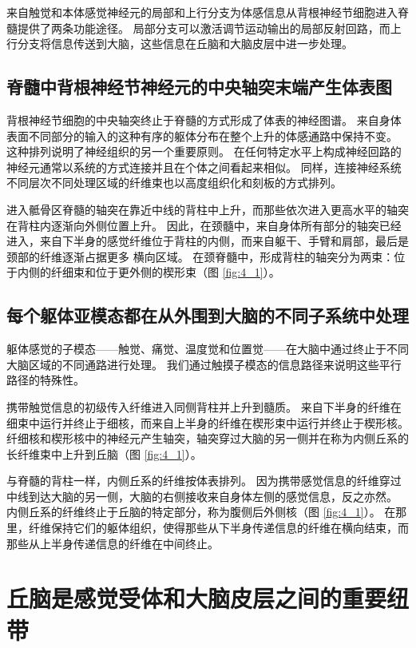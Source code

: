 来自触觉和本体感觉神经元的局部和上行分支为体感信息从背根神经节细胞进入脊髓提供了两条功能途径。 
局部分支可以激活调节运动输出的局部反射回路，而上行分支将信息传送到大脑，这些信息在丘脑和大脑皮层中进一步处理。


\subsection{脊髓中背根神经节神经元的中央轴突末端产生体表图}
背根神经节细胞的中央轴突终止于脊髓的方式形成了体表的神经图谱。 
来自身体表面不同部分的输入的这种有序的躯体分布在整个上升的体感通路中保持不变。 
这种排列说明了神经组织的另一个重要原则。 
在任何特定水平上构成神经回路的神经元通常以系统的方式连接并且在个体之间看起来相似。 
同样，连接神经系统不同层次不同处理区域的纤维束也以高度组织化和刻板的方式排列。


进入骶骨区脊髓的轴突在靠近中线的背柱中上升，而那些依次进入更高水平的轴突在背柱内逐渐向外侧位置上升。 
因此，在颈髓中，来自身体所有部分的轴突已经进入，来自下半身的感觉纤维位于背柱的内侧，而来自躯干、手臂和肩部，最后是颈部的纤维逐渐占据更多 横向区域。 
在颈脊髓中，形成背柱的轴突分为两束：位于内侧的纤细束和位于更外侧的楔形束（图 \ref{fig:4_1}）。


\subsection{每个躯体亚模态都在从外围到大脑的不同子系统中处理}

躯体感觉的子模态——触觉、痛觉、温度觉和位置觉——在大脑中通过终止于不同大脑区域的不同通路进行处理。 
我们通过触摸子模态的信息路径来说明这些平行路径的特殊性。


携带触觉信息的初级传入纤维进入同侧背柱并上升到髓质。 
来自下半身的纤维在细束中运行并终止于细核，而来自上半身的纤维在楔形束中运行并终止于楔形核。 
纤细核和楔形核中的神经元产生轴突，轴突穿过大脑的另一侧并在称为内侧丘系的长纤维束中上升到丘脑（图 \ref{fig:4_1}）。


与脊髓的背柱一样，内侧丘系的纤维按体表排列。 因为携带感觉信息的纤维穿过中线到达大脑的另一侧，大脑的右侧接收来自身体左侧的感觉信息，反之亦然。 
内侧丘系的纤维终止于丘脑的特定部分，称为腹侧后外侧核（图 \ref{fig:4_1}）。 
在那里，纤维保持它们的躯体组织，使得那些从下半身传递信息的纤维在横向结束，而那些从上半身传递信息的纤维在中间终止。


\section{丘脑是感觉受体和大脑皮层之间的重要纽带}

